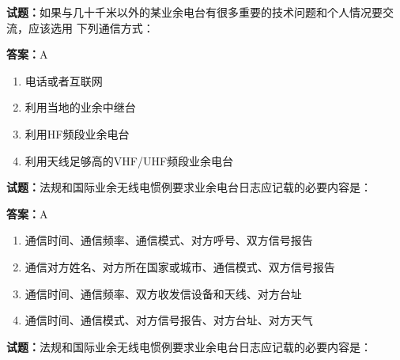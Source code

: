 \documentclass{ctexbook}
\begin{document}





\vspace{1em}

\textbf{试题：}如果与几十千米以外的某业余电台有很多重要的技术问题和个人情况要交流，应该选用
下列通信方式： 

\textbf{答案：}A 

\begin{enumerate}[leftmargin=3em]
  \item 电话或者互联网 

  \item 利用当地的业余中继台 

  \item 利用HF频段业余电台 

  \item 利用天线足够高的VHF/UHF频段业余电台 

\end{enumerate}





\vspace{1em}

\textbf{试题：}法规和国际业余无线电惯例要求业余电台日志应记载的必要内容是： 

\textbf{答案：}A 

\begin{enumerate}[leftmargin=3em]
  \item 通信时间、通信频率、通信模式、对方呼号、双方信号报告 

  \item 通信对方姓名、对方所在国家或城市、通信模式、双方信号报告 

  \item 通信时间、通信频率、双方收发信设备和天线、对方台址 

  \item 通信时间、通信模式、对方信号报告、对方台址、对方天气 

\end{enumerate}





\vspace{1em}

\textbf{试题：}法规和国际业余无线电惯例要求业余电台日志应记载的必要内容是： 
\end{document}

